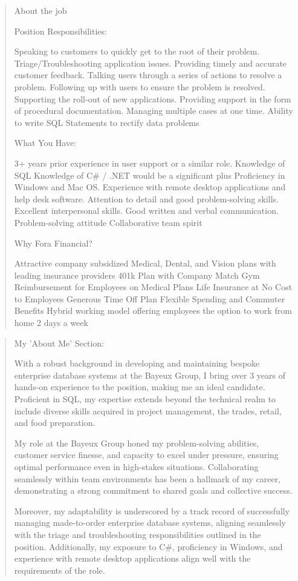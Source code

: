 \documentclass[
	letterpaper, %
	12pt, %
]{CSSullivanBusinessReport}
\begin{document}
\begin{quote}
	About the job
	
	Position Responsibilities:

    Speaking to customers to quickly get to the root of their problem.
    Triage/Troubleshooting application issues.
    Providing timely and accurate customer feedback.
    Talking users through a series of actions to resolve a problem.
    Following up with users to ensure the problem is resolved.
    Supporting the roll-out of new applications.
    Providing support in the form of procedural documentation.
    Managing multiple cases at one time.
    Ability to write SQL Statements to rectify data problems

	What You Have:

    3+ years prior experience in user support or a similar role.
    Knowledge of SQL
    Knowledge of C\# / .NET would be a significant plus
    Proficiency in Windows and Mac OS.
    Experience with remote desktop applications and help desk software.
    Attention to detail and good problem-solving skills.
    Excellent interpersonal skills.
    Good written and verbal communication.
    Problem-solving attitude
    Collaborative team spirit

	Why Fora Financial?

    Attractive company subsidized Medical, Dental, and Vision plans with leading insurance providers
    401k Plan with Company Match
    Gym Reimbursement for Employees on Medical Plans
    Life Insurance at No Cost to Employees
    Generous Time Off Plan
    Flexible Spending and Commuter Benefits
    Hybrid working model offering employees the option to work from home 2 days a week


\end{quote}

\begin{quote}
	My 'About Me' Section:

	With a robust background in developing and maintaining bespoke enterprise database systems at the Bayeux Group, I bring over 3 years of hands-on experience to the position, making me an ideal candidate. Proficient in SQL, my expertise extends beyond the technical realm to include diverse skills acquired in project management, the trades, retail, and food preparation.

	My role at the Bayeux Group honed my problem-solving abilities, customer service finesse, and capacity to excel under pressure, ensuring optimal performance even in high-stakes situations. Collaborating seamlessly within team environments has been a hallmark of my career, demonstrating a strong commitment to shared goals and collective success.

	Moreover, my adaptability is underscored by a track record of successfully managing made-to-order enterprise database systems, aligning seamlessly with the triage and troubleshooting responsibilities outlined in the position. Additionally, my exposure to C\#, proficiency in Windows, and experience with remote desktop applications align well with the requirements of the role.

\end{quote}
\end{document}
